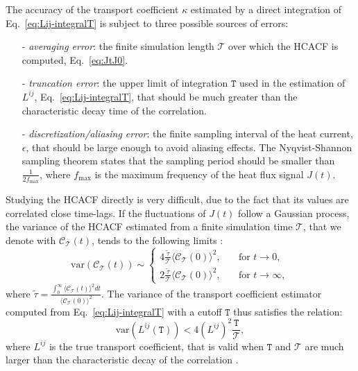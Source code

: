 \begin{LEtext}
The accuracy of the transport coefficient $\kappa$ estimated by a direct integration of Eq.~\eqref{eq:Lij-integralT} is subject to three possible sources of errors:
\begin{itemize}
    \item[-] \emph{averaging error}: the finite simulation length $\mathcal{T}$ over which the HCACF is computed, Eq.~\eqref{eq:JtJ0}.
    \item[-] \emph{truncation error}: the upper limit of integration $\mathtt{T}$ used in the estimation of $L^{ij}$, Eq.~\eqref{eq:Lij-integralT}, that should be much greater than the characteristic decay time of the correlation.
    \item[-] \emph{discretization/aliasing error}: the finite sampling interval of the heat current, $\epsilon$, that should be large enough to avoid aliasing effects. The Nyqvist-Shannon sampling theorem \cite{Oppenheim1999} states that the sampling period should be smaller than $\frac{1}{2f_\mathrm{max}}$, where $f_\mathrm{max}$ is the maximum frequency of the heat flux signal $J(t)$.
\end{itemize}
Studying the HCACF directly is very difficult, due to the fact that its values are correlated close time-lags. 
If the fluctuations of $J(t)$ follow a Gaussian process, the variance of the HCACF estimated from a finite simulation time $\mathcal{T}$, that we denote with $\mathcal{C}_\mathcal{T}(t)$, tends to the following limits \cite{Jones2012}:
\begin{equation}
    \mathrm{var} \left(\mathcal{C}_\mathcal{T}(t)\right) \sim \left\{
    \begin{aligned}
        4 \frac{\tilde\tau}{\mathcal{T}} \langle \mathcal{C}_\mathcal{T}(0) \rangle^2 , \quad &\text{for }t\rightarrow 0 , \\
        2 \frac{\tilde\tau}{\mathcal{T}} \langle \mathcal{C}_\mathcal{T}(0) \rangle^2 , \quad &\text{for }t\rightarrow \infty ,
    \end{aligned} \right.
\end{equation}
where $\tilde\tau = \frac{\int_0^\infty \langle \mathcal{C}_\mathcal{T}(t) \rangle^2 dt}{\langle \mathcal{C}_\mathcal{T}(0) \rangle^2}$. The variance of the transport coefficient estimator computed from Eq.~\eqref{eq:Lij-integralT} with a cutoff $\mathtt{T}$ thus satisfies the relation:
\begin{equation}
    \mathrm{var} \left(L^{ij}(\mathtt{T})\right) < 4 \left(L^{ij}\right)^2 \frac{\mathtt{T}}{\mathcal{T}} ,
\end{equation}
where $L^{ij}$ is the true transport coefficient, that is valid when $\mathtt{T}$ and $\mathcal{T}$ are much larger than the characteristic decay of the correlation \cite{Jones2012}.


\end{LEtext}

